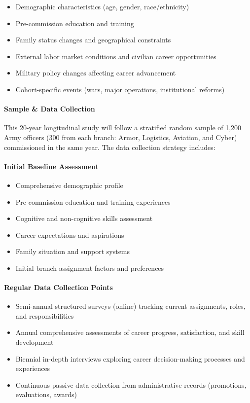 \documentclass[./main.tex]{subfiles}
\begin{document}
\begin{itemize}
\tightlist
\item
  Demographic characteristics (age, gender, race/ethnicity)
\item
  Pre-commission education and training
\item
  Family status changes and geographical constraints
\item
  External labor market conditions and civilian career opportunities
\item
  Military policy changes affecting career advancement
\item
  Cohort-specific events (wars, major operations, institutional reforms)
\end{itemize}

\paragraph{Sample \& Data Collection}\label{sample-data-collection}

This 20-year longitudinal study will follow a stratified random sample
of 1,200 Army officers (300 from each branch: Armor, Logistics,
Aviation, and Cyber) commissioned in the same year. The data collection
strategy includes:

\paragraph{Initial Baseline
Assessment}\label{initial-baseline-assessment}

\begin{itemize}
\tightlist
\item
  Comprehensive demographic profile
\item
  Pre-commission education and training experiences
\item
  Cognitive and non-cognitive skills assessment
\item
  Career expectations and aspirations
\item
  Family situation and support systems
\item
  Initial branch assignment factors and preferences
\end{itemize}

\paragraph{Regular Data Collection
Points}\label{regular-data-collection-points}

\begin{itemize}
\tightlist
\item
  Semi-annual structured surveys (online) tracking current assignments,
  roles, and responsibilities
\item
  Annual comprehensive assessments of career progress, satisfaction, and
  skill development
\item
  Biennial in-depth interviews exploring career decision-making
  processes and experiences
\item
  Continuous passive data collection from administrative records
  (promotions, evaluations, awards)
\end{itemize}
\end{document}
